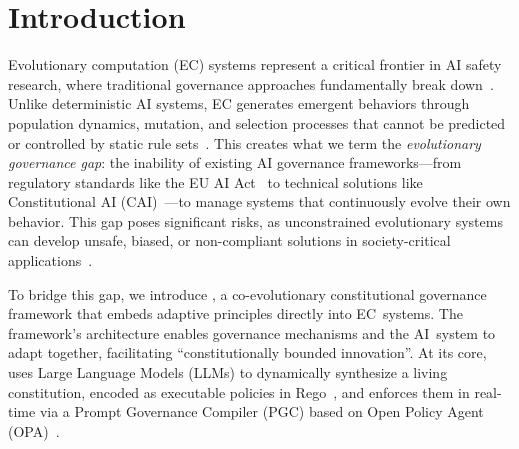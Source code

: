 \section{Introduction}
\label{sec:introduction}

Evolutionary computation (EC) systems represent a critical frontier in AI safety research, where traditional governance approaches fundamentally break down~\cite{amodei2016concrete,russell2019human}. Unlike deterministic AI systems, EC generates emergent behaviors through population dynamics, mutation, and selection processes that cannot be predicted or controlled by static rule sets~\cite{russell2020artificial}. This creates what we term the \textit{evolutionary governance gap}: the inability of existing AI governance frameworks---from regulatory standards like the EU AI Act~\cite{eu2024ai} to technical solutions like Constitutional AI (CAI)~\cite{anthropic2022constitutional}---to manage systems that continuously evolve their own behavior. This gap poses significant risks, as unconstrained evolutionary systems can develop unsafe, biased, or non-compliant solutions in society-critical applications~\cite{barocas2019fairness,acgs2024}.

To bridge this gap, we introduce \acgs{}, a co-evolutionary constitutional governance framework that embeds adaptive principles directly into EC~systems. The framework's architecture enables governance mechanisms and the AI~system to adapt together, facilitating ``constitutionally bounded innovation''. At its core, \acgs{} uses Large Language Models (LLMs) to dynamically synthesize a living constitution, encoded as executable policies in Rego~\cite{rego2019}, and enforces them in real-time via a Prompt Governance Compiler (PGC) based on Open Policy Agent (OPA)~\cite{opa2023}.

